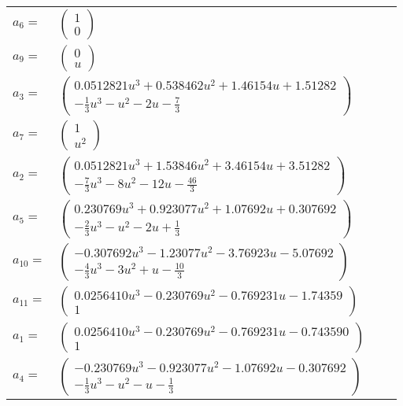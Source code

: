 \documentclass[1p]{elsarticle_modified}
\theoremstyle{definition}
\begin{document}
\begin{tabular}{m{7pt} m{180pt} m{7pt} m{180pt} }
\flushright $a_{6}=$&$\begin{pmatrix}1\\0\end{pmatrix}$ \\
\flushright $a_{9}=$&$\begin{pmatrix}0\\u\end{pmatrix}$ \\
\flushright $a_{3}=$&$\begin{pmatrix}0.0512821 u^{3}+0.538462 u^{2}+1.46154 u+1.51282\\-\frac{1}{3} u^3- u^2-2 u-\frac{7}{3}\end{pmatrix}$ \\
\flushright $a_{7}=$&$\begin{pmatrix}1\\u^2\end{pmatrix}$ \\
\flushright $a_{2}=$&$\begin{pmatrix}0.0512821 u^{3}+1.53846 u^{2}+3.46154 u+3.51282\\-\frac{7}{3} u^3-8 u^2-12 u-\frac{46}{3}\end{pmatrix}$ \\
\flushright $a_{5}=$&$\begin{pmatrix}0.230769 u^{3}+0.923077 u^{2}+1.07692 u+0.307692\\-\frac{2}{3} u^3- u^2-2 u+\frac{1}{3}\end{pmatrix}$ \\
\flushright $a_{10}=$&$\begin{pmatrix}-0.307692 u^{3}-1.23077 u^{2}-3.76923 u-5.07692\\-\frac{4}{3} u^3-3 u^2+u-\frac{10}{3}\end{pmatrix}$ \\
\flushright $a_{11}=$&$\begin{pmatrix}0.0256410 u^{3}-0.230769 u^{2}-0.769231 u-1.74359\\1\end{pmatrix}$ \\
\flushright $a_{1}=$&$\begin{pmatrix}0.0256410 u^{3}-0.230769 u^{2}-0.769231 u-0.743590\\1\end{pmatrix}$ \\
\flushright $a_{4}=$&$\begin{pmatrix}-0.230769 u^{3}-0.923077 u^{2}-1.07692 u-0.307692\\-\frac{1}{3} u^3- u^2- u-\frac{1}{3}\end{pmatrix}$ \\

\end{tabular}
\end{document}
